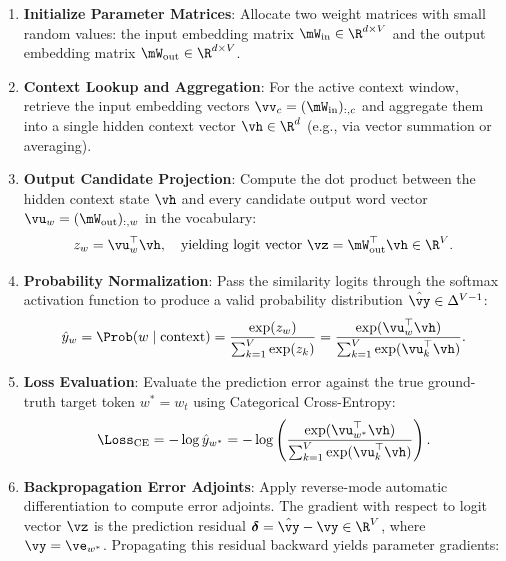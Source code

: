 \documentclass[../../main.tex]{subfiles}
\begin{document}
\begin{enumerate}
    \item \textbf{Initialize Parameter Matrices}: Allocate two weight matrices with small random values: the input embedding matrix $\mW_{\text{in}} \in \R^{d \times V}$ and the output embedding matrix $\mW_{\text{out}} \in \R^{d \times V}$.
    \item \textbf{Context Lookup and Aggregation}: For the active context window, retrieve the input embedding vectors $\vv_c = (\mW_{\text{in}})_{:, c}$ and aggregate them into a single hidden context vector $\vh \in \R^d$ (e.g., via vector summation or averaging).
    \item \textbf{Output Candidate Projection}: Compute the dot product between the hidden context state $\vh$ and every candidate output word vector $\vu_w = (\mW_{\text{out}})_{:, w}$ in the vocabulary:
    \begin{equation}
    \label{eq:logit_scoring}
    z_w = \vu_w^\top \vh, \quad \text{yielding logit vector } \vz = \mW_{\text{out}}^\top \vh \in \R^V.
    \end{equation}
    \item \textbf{Probability Normalization}: Pass the similarity logits through the softmax activation function to produce a valid probability distribution $\hat{\vy} \in \Delta^{V-1}$:
    \begin{equation}
    \label{eq:softmax_pred}
    \hat{y}_w = \Prob(w \mid \text{context}) = \frac{\exp(z_w)}{\sum_{k=1}^V \exp(z_k)} = \frac{\exp(\vu_w^\top \vh)}{\sum_{k=1}^V \exp(\vu_k^\top \vh)}.
    \end{equation}
    \item \textbf{Loss Evaluation}: Evaluate the prediction error against the true ground-truth target token $w^* = w_t$ using Categorical Cross-Entropy:
    \begin{equation}
    \label{eq:ce_loss}
    \Loss_{\text{CE}} = -\log \hat{y}_{w^*} = -\log \left( \frac{\exp(\vu_{w^*}^\top \vh)}{\sum_{k=1}^V \exp(\vu_k^\top \vh)} \right).
    \end{equation}
    \item \textbf{Backpropagation Error Adjoints}: Apply reverse-mode automatic differentiation to compute error adjoints. The gradient with respect to logit vector $\vz$ is the prediction residual $\boldsymbol{\delta} = \hat{\vy} - \vy \in \R^V$, where $\vy = \ve_{w^*}$. Propagating this residual backward yields parameter gradients:
    \begin{equation}
    \label{eq:param_gradients}

\end{equation}
\end{enumerate}
\end{document}
